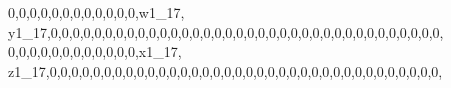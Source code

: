 \documentclass[]{article}
\newenvironment{Shaded}{\begin{snugshade}}{\end{snugshade}}
\newcommand{\DecValTok}[1]{\textcolor[rgb]{0.00,0.00,0.81}{#1}}
\newcommand{\NormalTok}[1]{#1}
\begin{document}
\begin{Shaded}
\begin{Highlighting}[]
\DecValTok{0}\NormalTok{,}\DecValTok{0}\NormalTok{,}\DecValTok{0}\NormalTok{,}\DecValTok{0}\NormalTok{,}\DecValTok{0}\NormalTok{,}\DecValTok{0}\NormalTok{,}\DecValTok{0}\NormalTok{,}\DecValTok{0}\NormalTok{,}\DecValTok{0}\NormalTok{,}\DecValTok{0}\NormalTok{,}\DecValTok{0}\NormalTok{,}\DecValTok{0}\NormalTok{,w1_}\DecValTok{17}\NormalTok{, y1_}\DecValTok{17}\NormalTok{,}\DecValTok{0}\NormalTok{,}\DecValTok{0}\NormalTok{,}\DecValTok{0}\NormalTok{,}\DecValTok{0}\NormalTok{,}\DecValTok{0}\NormalTok{,}\DecValTok{0}\NormalTok{,}\DecValTok{0}\NormalTok{,}\DecValTok{0}\NormalTok{,}\DecValTok{0}\NormalTok{,}\DecValTok{0}\NormalTok{,}\DecValTok{0}\NormalTok{,}\DecValTok{0}\NormalTok{,}\DecValTok{0}\NormalTok{,}\DecValTok{0}\NormalTok{,}\DecValTok{0}\NormalTok{,}\DecValTok{0}\NormalTok{,}\DecValTok{0}\NormalTok{,}\DecValTok{0}\NormalTok{,}\DecValTok{0}\NormalTok{,}\DecValTok{0}\NormalTok{,}\DecValTok{0}\NormalTok{,}\DecValTok{0}\NormalTok{,}\DecValTok{0}\NormalTok{,}\DecValTok{0}\NormalTok{,}\DecValTok{0}\NormalTok{,}\DecValTok{0}\NormalTok{,}\DecValTok{0}\NormalTok{,}\DecValTok{0}\NormalTok{,}\DecValTok{0}\NormalTok{,}\DecValTok{0}\NormalTok{,}\DecValTok{0}\NormalTok{,}\DecValTok{0}\NormalTok{,}\DecValTok{0}\NormalTok{,}\DecValTok{0}\NormalTok{,}\DecValTok{0}\NormalTok{,}\DecValTok{0}\NormalTok{,}
\DecValTok{0}\NormalTok{,}\DecValTok{0}\NormalTok{,}\DecValTok{0}\NormalTok{,}\DecValTok{0}\NormalTok{,}\DecValTok{0}\NormalTok{,}\DecValTok{0}\NormalTok{,}\DecValTok{0}\NormalTok{,}\DecValTok{0}\NormalTok{,}\DecValTok{0}\NormalTok{,}\DecValTok{0}\NormalTok{,}\DecValTok{0}\NormalTok{,}\DecValTok{0}\NormalTok{,x1_}\DecValTok{17}\NormalTok{, z1_}\DecValTok{17}\NormalTok{,}\DecValTok{0}\NormalTok{,}\DecValTok{0}\NormalTok{,}\DecValTok{0}\NormalTok{,}\DecValTok{0}\NormalTok{,}\DecValTok{0}\NormalTok{,}\DecValTok{0}\NormalTok{,}\DecValTok{0}\NormalTok{,}\DecValTok{0}\NormalTok{,}\DecValTok{0}\NormalTok{,}\DecValTok{0}\NormalTok{,}\DecValTok{0}\NormalTok{,}\DecValTok{0}\NormalTok{,}\DecValTok{0}\NormalTok{,}\DecValTok{0}\NormalTok{,}\DecValTok{0}\NormalTok{,}\DecValTok{0}\NormalTok{,}\DecValTok{0}\NormalTok{,}\DecValTok{0}\NormalTok{,}\DecValTok{0}\NormalTok{,}\DecValTok{0}\NormalTok{,}\DecValTok{0}\NormalTok{,}\DecValTok{0}\NormalTok{,}\DecValTok{0}\NormalTok{,}\DecValTok{0}\NormalTok{,}\DecValTok{0}\NormalTok{,}\DecValTok{0}\NormalTok{,}\DecValTok{0}\NormalTok{,}\DecValTok{0}\NormalTok{,}\DecValTok{0}\NormalTok{,}\DecValTok{0}\NormalTok{,}\DecValTok{0}\NormalTok{,}\DecValTok{0}\NormalTok{,}\DecValTok{0}\NormalTok{,}\DecValTok{0}\NormalTok{,}\DecValTok{0}\NormalTok{,}\DecValTok{0}\NormalTok{,}

\end{Highlighting}
\end{Shaded}
\end{document}
